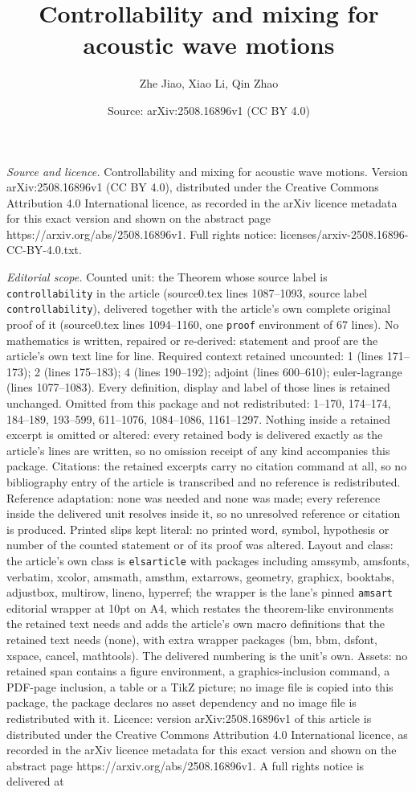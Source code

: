 \documentclass[10pt,a4paper]{amsart}
\title[Controllability and mixing for acoustic wave motions]{Controllability and mixing for acoustic wave motions}
\author{Zhe Jiao, Xiao Li, Qin Zhao}
\date{Source: arXiv:2508.16896v1 (CC BY 4.0)}
\begin{document}
\maketitle

\noindent\emph{Source and licence.} Controllability and mixing for acoustic wave motions. Version arXiv:2508.16896v1 (CC BY 4.0), distributed under the Creative Commons Attribution 4.0 International licence, as recorded in the arXiv licence metadata for this exact version and shown on the abstract page https://arxiv.org/abs/2508.16896v1. Full rights notice: licenses/arxiv-2508.16896-CC-BY-4.0.txt.\par\smallskip

\noindent\textit{Editorial scope.} Counted unit: the Theorem whose source label is \texttt{controllability} in the article (source0.tex lines 1087--1093, source label \texttt{controllability}), delivered together with the article's own complete original proof of it (source0.tex lines 1094--1160, one \texttt{proof} environment of 67 lines). No mathematics is written, repaired or re-derived: statement and proof are the article's own text line for line. Required context retained uncounted: 1 (lines 171--173); 2 (lines 175--183); 4 (lines 190--192); adjoint (lines 600--610); euler-lagrange (lines 1077--1083). Every definition, display and label of those lines is retained unchanged. Omitted from this package and not redistributed: 1--170, 174--174, 184--189, 193--599, 611--1076, 1084--1086, 1161--1297. Nothing inside a retained excerpt is omitted or altered: every retained body is delivered exactly as the article's lines are written, so no omission receipt of any kind accompanies this package. Citations: the retained excerpts carry no citation command at all, so no bibliography entry of the article is transcribed and no reference is redistributed. Reference adaptation: none was needed and none was made; every reference inside the delivered unit resolves inside it, so no unresolved reference or citation is produced. Printed slips kept literal: no printed word, symbol, hypothesis or number of the counted statement or of its proof was altered. Layout and class: the article's own class is \texttt{elsarticle} with packages including amssymb, amsfonts, verbatim, xcolor, amsmath, amsthm, extarrows, geometry, graphicx, booktabs, adjustbox, multirow, lineno, hyperref; the wrapper is the lane's pinned \texttt{amsart} editorial wrapper at 10pt on A4, which restates the theorem-like environments the retained text needs and adds the article's own macro definitions that the retained text needs (none), with extra wrapper packages (bm, bbm, dsfont, xspace, cancel, mathtools). The delivered numbering is the unit's own. Assets: no retained span contains a figure environment, a graphics-inclusion command, a PDF-page inclusion, a table or a TikZ picture; no image file is copied into this package, the package declares no asset dependency and no image file is redistributed with it. Licence: version arXiv:2508.16896v1 of this article is distributed under the Creative Commons Attribution 4.0 International licence, as recorded in the arXiv licence metadata for this exact version and shown on the abstract page https://arxiv.org/abs/2508.16896v1. A full rights notice is delivered at 
\end{document}
